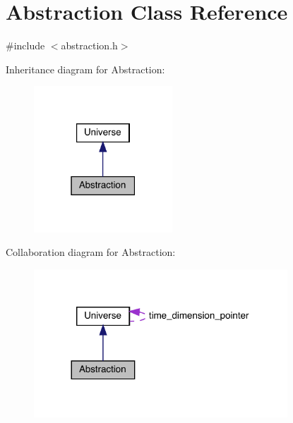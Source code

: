 \hypertarget{class_abstraction}{}\section{Abstraction Class Reference}
\label{class_abstraction}


{\ttfamily \#include $<$abstraction.\+h$>$}



Inheritance diagram for Abstraction\+:\nopagebreak
\begin{figure}[H]
\begin{center}
\leavevmode
\includegraphics[width=147pt]{class_abstraction__inherit__graph}
\end{center}
\end{figure}


Collaboration diagram for Abstraction\+:
\nopagebreak
\begin{figure}[H]
\begin{center}
\leavevmode
\includegraphics[width=269pt]{class_abstraction__coll__graph}
\end{center}
\end{figure}
